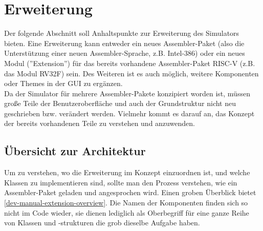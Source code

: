 
\section{Erweiterung}
\label{sec:extension}

Der folgende Abschnitt soll Anhaltspunkte zur Erweiterung des Simulators bieten.
Eine Erweiterung kann entweder ein neues Assembler-Paket (also die Unterstützung
einer neuen Assembler-Sprache, z.B. Intel-386) oder ein
neues Modul (''Extension'') für das bereits vorhandene Assembler-Paket RISC-V
(z.B. das Modul RV32F) sein. Des Weiteren ist es auch möglich, weitere
Komponenten oder Themes in der GUI zu ergänzen.\\

Da der Simulator für mehrere Assembler-Pakete konzipiert worden ist, müssen
große Teile der Benutzeroberfläche und auch der Grundstruktur nicht neu
geschrieben bzw. verändert werden. Vielmehr kommt es darauf an, das Konzept der
bereits vorhandenen Teile zu verstehen und anzuwenden.\\

\subsection{Übersicht zur Architektur}

Um zu verstehen, wo die Erweiterung im Konzept einzuordnen ist, und welche
Klassen zu implementieren sind, sollte man den Prozess verstehen, wie ein
Assembler-Paket geladen und angesprochen wird. Einen groben Überblick bietet \autoref{dev-manual-extension-overview}. Die Namen der Komponenten finden sich so nicht im Code
wieder, sie dienen lediglich als Oberbegriff für eine ganze Reihe von Klassen
und -strukturen die grob dieselbe Aufgabe haben.

